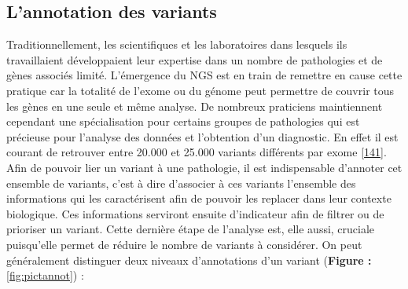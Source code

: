 \documentclass[12pt,twoside]{ugathesis}
\theoremstyle{definition}
\theoremstyle{definition}
\theoremstyle{remark}
\begin{document}
\newpage

\subsection{L'annotation des variants}\label{lannotation-des-variants}

Traditionnellement, les scientifiques et les laboratoires dans lesquels
ils travaillaient développaient leur expertise dans un nombre de
pathologies et de gènes associés limité. L'émergence du NGS est en train
de remettre en cause cette pratique car la totalité de l'exome ou du
génome peut permettre de couvrir tous les gènes en une seule et même
analyse. De nombreux praticiens maintiennent cependant une
spécialisation pour certains groupes de pathologies qui est précieuse
pour l'analyse des données et l'obtention d'un diagnostic. En effet il
est courant de retrouver entre 20.000 et 25.000 variants différents par
exome {[}\protect\hyperlink{ref-Gonzaga-Jauregui2012}{141}{]}. Afin de
pouvoir lier un variant à une pathologie, il est indispensable d'annoter
cet ensemble de variants, c'est à dire d'associer à ces variants
l'ensemble des informations qui les caractérisent afin de pouvoir les
replacer dans leur contexte biologique. Ces informations serviront
ensuite d'indicateur afin de filtrer ou de prioriser un variant. Cette
dernière étape de l'analyse est, elle aussi, cruciale puisqu'elle permet
de réduire le nombre de variants à considérer. On peut généralement
distinguer deux niveaux d'annotations d'un variant (\textbf{Figure :}
\ref{fig:pictannot}) :
\end{document}
